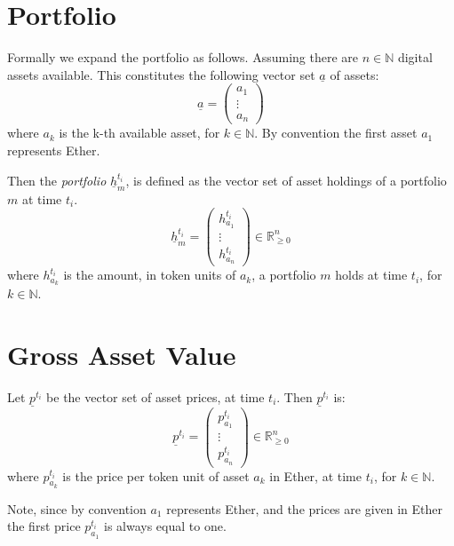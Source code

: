 \documentclass[9pt,oneside]{amsart}
\theoremstyle{plain}
\begin{document}
\section{Portfolio}\label{app:defportfolio}

Formally we expand the portfolio as follows. Assuming there are $n \in \mathbb{N}$ digital assets available. This constitutes the following vector set $\underline{a}$ of assets:
\begin{equation}
	\underline{a} = \begin{pmatrix}a_{1}\\ \vdots \\ a_{n}\end{pmatrix}
\end{equation}
where $a_k$ is the k-th available asset, for $k \in \mathbb{N}$.
By convention the first asset $a_1$ represents Ether.

Then the \textit{portfolio} $\underline{h}_m^{t_i}$, is defined as the vector set of asset holdings of a portfolio $m$ at time $t_i$.
\begin{equation}
	\underline{h}_m^{t_i} = \begin{pmatrix}h_{a_{1}}^{t_i}\\ \vdots \\ h_{a_{n}}^{t_i}\end{pmatrix} \in \mathbb{R}_{\geq 0}^n
\end{equation}
where $h_{a_{k}}^{t_i}$ is the amount, in token units of $a_k$, a portfolio $m$ holds at time $t_i$, for $k \in \mathbb{N}$.

\section{Gross Asset Value}\label{app:defgav}

Let $\underline{p}^{t_i}$ be the vector set of asset prices, at time $t_i$. Then $\underline{p}^{t_i}$ is:
\begin{equation}
	\underline{p}^{t_i} = \begin{pmatrix}p_{a_{1}}^{t_i}\\ \vdots \\ p_{a_{n}}^{t_i}\end{pmatrix} \in \mathbb{R}_{\geq 0}^n
\end{equation}
where $p_{a_{k}}^{t_i}$ is the price per token unit of asset $a_k$ in Ether, at time $t_i$, for $k \in \mathbb{N}$.

Note, since by convention $a_1$ represents Ether, and the prices are given in Ether the first price $p_{a_{1}}^{t_i}$ is always equal to one.
\end{document}
